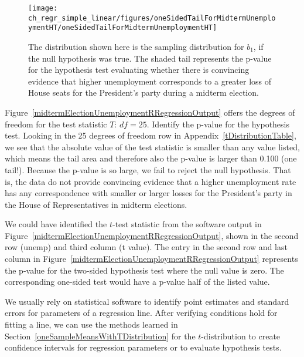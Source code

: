 \begin{figure}[h]
\centering
\texttt{[image: ch\_regr\_simple\_linear/figures/oneSidedTailForMidtermUnemploymentHT/oneSidedTailForMidtermUnemploymentHT]}
\caption{The distribution shown here is the sampling distribution for $b_1$, if the null hypothesis was true. The shaded tail represents the p-value for the hypothesis test evaluating whether there is convincing evidence that higher unemployment corresponds to a greater loss of House seats for the President's party during a midterm election.}
\label{oneSidedTailForMidtermUnemploymentHT}
\end{figure}

\begin{example}{Figure~\ref{midtermElectionUnemploymentRRegressionOutput} offers the degrees of freedom for the test statistic $T$: $df=25$. Identify the p-value for the hypothesis test.}
Looking in the 25 degrees of freedom row in Appendix~\ref{tDistributionTable}, we see that the absolute value of the test statistic is smaller than any value listed, which means the tail area and therefore also the p-value is larger than 0.100 (one tail!). Because the p-value is so large, we fail to reject the null hypothesis. That is, the data do not provide convincing evidence that a higher unemployment rate has any correspondence with smaller or larger losses for the President's party in the House of Representatives in midterm elections.
\end{example}

We could have identified the $t$-test statistic from the software output in Figure~\ref{midtermElectionUnemploymentRRegressionOutput}, shown in the second row (unemp) and third column (t value). The entry in the second row and last column in Figure~\ref{midtermElectionUnemploymentRRegressionOutput} represents the p-value for the two-sided hypothesis test where the null value is zero. The corresponding one-sided test would have a p-value half of the listed value.

\begin{termBox}{
We usually rely on statistical software to identify point estimates and standard errors for parameters of a regression line. After verifying conditions hold for fitting a line, we can use the methods learned in Section~\ref{oneSampleMeansWithTDistribution} for the $t$-distribution to create confidence intervals for regression parameters or to evaluate hypothesis tests.}
\end{termBox}

